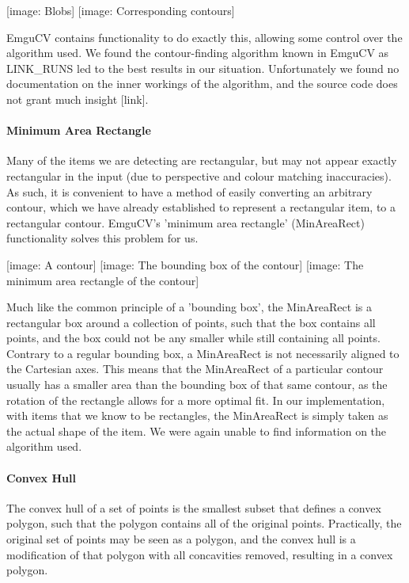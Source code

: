 \documentclass[10pt,twocolumn]{scrartcl}
\begin{document}
[image: Blobs] [image: Corresponding contours]

EmguCV contains functionality to do exactly this, allowing some control over the algorithm used. We found the contour-finding algorithm known in EmguCV as LINK\_RUNS led to the best results in our situation. Unfortunately we found no documentation on the inner workings of the algorithm, and the source code does not grant much insight [link].

\paragraph{Minimum Area Rectangle}
Many of the items we are detecting are rectangular, but may not appear exactly rectangular in the input (due to perspective and colour matching inaccuracies). As such, it is convenient to have a method of easily converting an arbitrary contour, which we have already established to represent a rectangular item, to a rectangular contour. EmguCV's 'minimum area rectangle' (MinAreaRect) functionality solves this problem for us.

[image: A contour] [image: The bounding box of the contour] [image: The minimum area rectangle of the contour]

Much like the common principle of a 'bounding box', the MinAreaRect is a rectangular box around a collection of points, such that the box contains all points, and the box could not be any smaller while still containing all points. Contrary to a regular bounding box, a MinAreaRect is not necessarily aligned to the Cartesian axes. This means that the MinAreaRect of a particular contour usually has a smaller area than the bounding box of that same contour, as the rotation of the rectangle allows for a more optimal fit. In our implementation, with items that we know to be rectangles, the MinAreaRect is simply taken as the actual shape of the item. We were again unable to find information on the algorithm used.

\paragraph{Convex Hull}
The convex hull of a set of points is the smallest subset that defines a convex polygon, such that the polygon contains all of the original points. Practically, the original set of points may be seen as a polygon, and the convex hull is a modification of that polygon with all concavities removed, resulting in a convex polygon.
\end{document}
